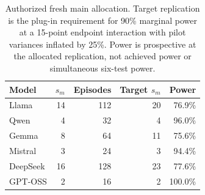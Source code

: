\begin{table}[t]
\centering
\small
\setlength{\tabcolsep}{4pt}
\begin{tabular}{lrrrr}
\toprule
Model & $s_m$ & Episodes & Target $s_m$ & Power \\
\midrule
Llama & 14 & 112 & 20 & 76.9\% \\
Qwen & 4 & 32 & 4 & 96.0\% \\
Gemma & 8 & 64 & 11 & 75.6\% \\
Mistral & 3 & 24 & 3 & 94.4\% \\
DeepSeek & 16 & 128 & 23 & 77.6\% \\
GPT-OSS & 2 & 16 & 2 & 100.0\% \\
\bottomrule
\end{tabular}
\caption{Authorized fresh main allocation. Target replication is the plug-in requirement for 90\% marginal power at a 15-point endpoint interaction with pilot variances inflated by 25\%. Power is prospective at the allocated replication, not achieved power or simultaneous six-test power.}
\label{tab:allocation}
\end{table}
